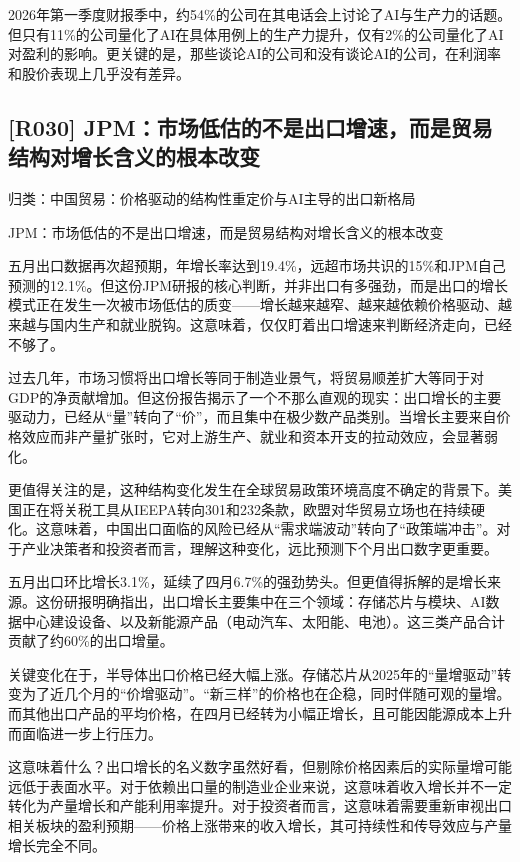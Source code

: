 \documentclass[11pt]{ctexart}
\begin{document}
2026年第一季度财报季中，约54\%的公司在其电话会上讨论了AI与生产力的话题。但只有11\%的公司量化了AI在具体用例上的生产力提升，仅有2\%的公司量化了AI对盈利的影响。更关键的是，那些谈论AI的公司和没有谈论AI的公司，在利润率和股价表现上几乎没有差异。

\subsection{[R030] JPM：市场低估的不是出口增速，而是贸易结构对增长含义的根本改变}
{\small\color{refgray}归类：中国贸易：价格驱动的结构性重定价与AI主导的出口新格局}

JPM：市场低估的不是出口增速，而是贸易结构对增长含义的根本改变

五月出口数据再次超预期，年增长率达到19.4\%，远超市场共识的15\%和JPM自己预测的12.1\%。但这份JPM研报的核心判断，并非出口有多强劲，而是出口的增长模式正在发生一次被市场低估的质变——增长越来越窄、越来越依赖价格驱动、越来越与国内生产和就业脱钩。这意味着，仅仅盯着出口增速来判断经济走向，已经不够了。

过去几年，市场习惯将出口增长等同于制造业景气，将贸易顺差扩大等同于对GDP的净贡献增加。但这份报告揭示了一个不那么直观的现实：出口增长的主要驱动力，已经从“量”转向了“价”，而且集中在极少数产品类别。当增长主要来自价格效应而非产量扩张时，它对上游生产、就业和资本开支的拉动效应，会显著弱化。

更值得关注的是，这种结构变化发生在全球贸易政策环境高度不确定的背景下。美国正在将关税工具从IEEPA转向301和232条款，欧盟对华贸易立场也在持续硬化。这意味着，中国出口面临的风险已经从“需求端波动”转向了“政策端冲击”。对于产业决策者和投资者而言，理解这种变化，远比预测下个月出口数字更重要。

五月出口环比增长3.1\%，延续了四月6.7\%的强劲势头。但更值得拆解的是增长来源。这份研报明确指出，出口增长主要集中在三个领域：存储芯片与模块、AI数据中心建设设备、以及新能源产品（电动汽车、太阳能、电池）。这三类产品合计贡献了约60\%的出口增量。

关键变化在于，半导体出口价格已经大幅上涨。存储芯片从2025年的“量增驱动”转变为了近几个月的“价增驱动”。“新三样”的价格也在企稳，同时伴随可观的量增。而其他出口产品的平均价格，在四月已经转为小幅正增长，且可能因能源成本上升而面临进一步上行压力。

这意味着什么？出口增长的名义数字虽然好看，但剔除价格因素后的实际量增可能远低于表面水平。对于依赖出口量的制造业企业来说，这意味着收入增长并不一定转化为产量增长和产能利用率提升。对于投资者而言，这意味着需要重新审视出口相关板块的盈利预期——价格上涨带来的收入增长，其可持续性和传导效应与产量增长完全不同。
\end{document}
